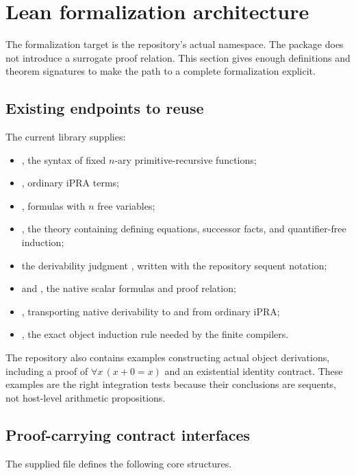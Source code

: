 \section{Lean formalization architecture}

The formalization target is the repository's actual  namespace.  The package does not introduce a surrogate proof relation.  This section gives enough definitions and theorem signatures to make the path to a complete formalization explicit.

\subsection{Existing endpoints to reuse}

The current library supplies:

\begin{itemize}
  \item {}, the syntax of fixed $n$-ary primitive-recursive functions;
  \item {}, ordinary iPRA terms;
  \item {}, formulas with $n$ free variables;
  \item {}, the theory containing defining equations, successor facts, and quantifier-free induction;
  \item the derivability judgment , written with the repository sequent notation;
  \item {} and , the native scalar formulas and proof relation;
  \item {}, transporting native derivability to and from ordinary iPRA;
  \item {}, the exact object induction rule needed by the finite compilers.
\end{itemize}

The repository also contains examples constructing actual object derivations, including a proof of $\forall x\,(x+0=x)$ and an existential identity contract.  These examples are the right integration tests because their conclusions are sequents, not host-level arithmetic propositions.

\subsection{Proof-carrying contract interfaces}

The supplied file  defines the following core structures.

